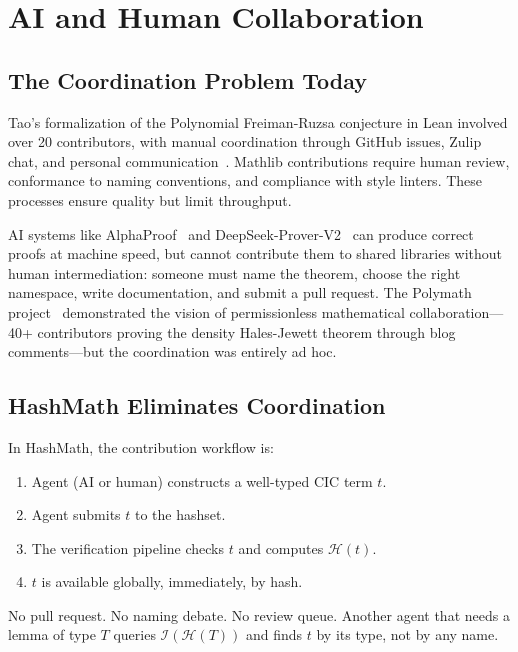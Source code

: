 \documentclass[11pt]{article}
\theoremstyle{definition}
\theoremstyle{plain}
\theoremstyle{remark}
\newcommand{\hash}{\mathcal{H}}
\newcommand{\typeindex}{\mathcal{I}}
\begin{document}
\section{AI and Human Collaboration}
\label{sec:collaboration}

\subsection{The Coordination Problem Today}
\label{sec:coordination-today}

Tao's formalization of the Polynomial Freiman-Ruzsa conjecture in Lean involved over 20
contributors, with manual coordination through GitHub issues, Zulip chat, and personal
communication~\cite{tao2025}.
Mathlib contributions require human review, conformance to naming conventions, and compliance
with style linters.
These processes ensure quality but limit throughput.

AI systems like AlphaProof~\cite{alphaproof} and DeepSeek-Prover-V2~\cite{deepseek}
can produce correct proofs at machine speed, but cannot contribute them to shared
libraries without human intermediation: someone must name the theorem, choose the right
namespace, write documentation, and submit a pull request.
The Polymath project~\cite{gowers2009} demonstrated the vision of permissionless mathematical
collaboration---40+ contributors proving the density Hales-Jewett theorem through blog
comments---but the coordination was entirely ad hoc.

\subsection{HashMath Eliminates Coordination}
\label{sec:no-coordination}

In HashMath, the contribution workflow is:
\begin{enumerate}[nosep]
  \item Agent (AI or human) constructs a well-typed CIC term $t$.
  \item Agent submits $t$ to the hashset.
  \item The verification pipeline checks $t$ and computes $\hash(t)$.
  \item $t$ is available globally, immediately, by hash.
\end{enumerate}

No pull request.
No naming debate.
No review queue.
Another agent that needs a lemma of type $T$ queries $\typeindex(\hash(T))$ and finds $t$
by its type, not by any name.
\end{document}
